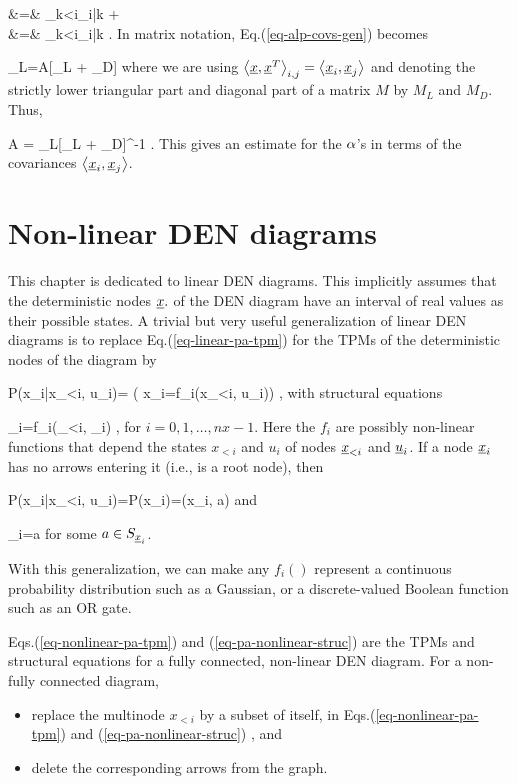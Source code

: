 \beqa
{}&=&
\sum_{k<i}\alp_{i|k}
+
\\
&=&
\sum_{k<i}\alp_{i|k}
\;.
\label{eq-alp-covs-gen}
\eeqa
In matrix notation, 
Eq.(\ref{eq-alp-covs-gen}) becomes

\beq
{}_L=A[_L + 
_D]
\eeq
where
we are
using 
$\left\langle{\underline{x}}, {\underline{x}}^T\right\rangle_{i, j}=
\left\langle{\underline{x}}_i, {\underline{x}}_j\right\rangle$
and denoting
the strictly lower triangular part
and diagonal part
of a matrix $M$ by $M_L$  
and $M_D$. Thus,

\beq
A = _L[_L
+ _D]^{-1}
\;.
\eeq
This gives an estimate
for the $\alpha$'s
in terms of the
 covariances $\left\langle{\underline{x}}_i, {\underline{x}}_j\right\rangle$.

\section{Non-linear DEN diagrams}
This chapter 
is dedicated to
linear DEN diagrams. This
implicitly
assumes that 
the deterministic
nodes ${\underline{x}}.$
of the 
DEN diagram have
an interval of
real values as their
possible states.
A trivial
but very useful
generalization
of linear DEN diagrams is to
replace Eq.(\ref{eq-linear-pa-tpm})
for the TPMs
of the
deterministic nodes
of the diagram by

\beq\color{blue}
P(x_i|x_{<i}, u_i)=
\indi(
x_i=f_i(x_{<i}, u_i))
\;,
\label{eq-nonlinear-pa-tpm}
\eeq
with structural equations

\beq
\rvx_i=f_i(\rvx_{<i}, \rvu_i)
\;,
\label{eq-pa-nonlinear-struc}
\eeq
for $i=0, 1, \ldots, nx-1$.
Here the $f_i$ are 
possibly non-linear
functions
that depend
the states
$x_{<i}$ and $u_i$
of nodes ${\underline{x}}_{<i}$
and ${\underline{u}}_i$.
If a node ${\underline{x}}_i$
has no arrows
entering it (i.e., is
a root node), then

\beq\color{blue}
P(x_i|x_{<i}, u_i)=P(x_i)=\delta(x_i, a)
\eeq
and

\beq
\rvx_i=a
\eeq
for some $a\in S_{{\underline{x}}_i}$.


With this generalization,
we can make any
$f_i()$
represent a
continuous probability
distribution
such as a Gaussian,
or a discrete-valued Boolean
function
such as an OR gate.


Eqs.(\ref{eq-nonlinear-pa-tpm})
and (\ref{eq-pa-nonlinear-struc})
are the TPMs and
structural equations
for a 
fully connected, non-linear DEN diagram.
For a non-fully connected 
diagram, 
\begin{itemize}
\item
replace the multinode $x_{<i}$
by a subset of itself,
in 
Eqs.(\ref{eq-nonlinear-pa-tpm})
and (\ref{eq-pa-nonlinear-struc})
,
and
\item
delete
the corresponding arrows
from the graph.
\end{itemize}

